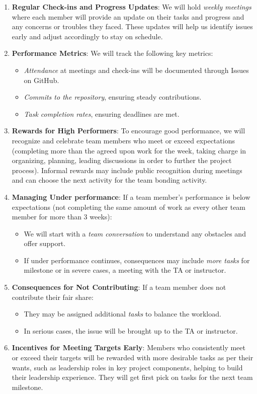 \documentclass{article}
\begin{document}
\begin{enumerate}
  \item \textbf{Regular Check-ins and Progress Updates}: We will hold
    \textit{weekly meetings} where each member will
    provide an update on their tasks and progress and any concerns or
    troubles they faced. These updates will help us identify issues
    early and adjust accordingly to stay on schedule.
  \item \textbf{Performance Metrics}: We will track the following key metrics:
    \begin{itemize}
      \item \textit{Attendance} at meetings and check-ins will be
        documented through Issues on GitHub.
      \item \textit{Commits to the repository}, ensuring steady contributions.
      \item \textit{Task completion rates}, ensuring deadlines are met.
    \end{itemize}
    \item \textbf{Rewards for High Performers}: To encourage good performance, we will recognize and celebrate team members who meet or exceed expectations (completing more than the agreed upon work for the week, taking charge in organizing, planning, leading discussions in order to further the project process).
    Informal rewards may include public recognition during meetings and can choose the next activity for the team bonding activity.
    \item \textbf{Managing Under performance}: If a team member's performance is below expectations (not completing the same amount of work as every other team member for more than 3 weeks):
    \begin{itemize}
      \item We will start with a \textit{team conversation} to
        understand any obstacles and offer support.
      \item If under performance continues, consequences may include
        \textit{more tasks} for milestone or in severe cases, a meeting with
        the TA or instructor.
    \end{itemize}
  \item \textbf{Consequences for Not Contributing}: If a team member
    does not contribute their fair share:
    \begin{itemize}
      \item They may be assigned additional \textit{tasks} to balance
        the workload.
      \item In serious cases, the issue will be brought up to the TA
        or instructor.
    \end{itemize}
  \item \textbf{Incentives for Meeting Targets Early}: Members who
    consistently meet or exceed their targets will be rewarded with more
    desirable tasks as per their wants, such as leadership roles in
    key project components, helping to build their leadership experience. They
    will get first pick on tasks for the next team milestone.

\end{enumerate}
\end{document}
